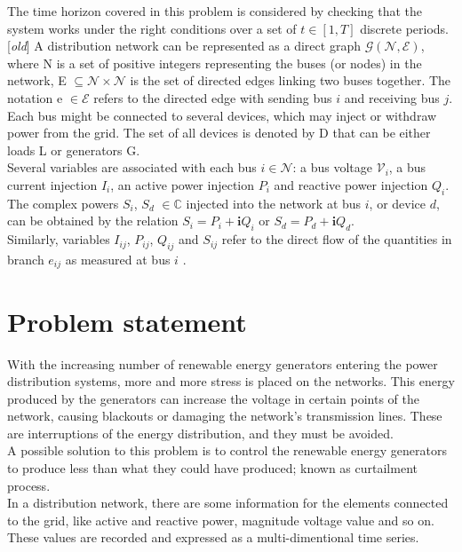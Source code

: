 The time horizon covered in this problem is considered by checking that the system works under the right conditions over a set of $t \in [1,T]$ discrete periods.\\

[\emph{old}] A distribution network can be represented as a direct graph $\mathcal{G}(\mathcal{N},\mathcal{E})$, where \gls{N} is a set of positive integers representing the buses (or nodes) in the network, \gls{E} $\subseteq \mathcal{N} \times \mathcal{N}$ is the set of directed edges linking two buses together. The notation \gls{e} $\in \mathcal{E}$ refers to the directed edge with sending bus $i$ and receiving bus $j$. Each bus might be connected to several devices, which may inject or withdraw power from the grid. The set of all devices is denoted by \gls{D} that can be either loads \gls{L} or generators \gls{G}. \\
Several variables are associated with each bus $i \in \mathcal{N}$: a bus voltage $\mathcal{V}_i$, a bus current injection $I_i$, an active power injection $P_i$ and reactive power injection $Q_i$. The complex powers $S_i$, $S_d$ $\in \mathbb{C}$ injected into the network at bus $i$, or device $d$, can be obtained by the relation $S_i = P_i + \mathbf{i}Q_i$ or $S_d = P_d + \mathbf{i}Q_d$. \\
Similarly, variables $I_{ij}$, $P_{ij}$, $Q_{ij}$ and $S_{ij}$ refer to the direct flow of the quantities in branch $e_{ij}$ as measured at bus $i$ \cite{gym-anm}.

\section{Problem statement}
\label{sec:ProbStat}
With the increasing number of renewable energy generators entering the power distribution systems, more and more stress is placed on the networks. This energy produced by the generators can increase the voltage in certain points of the network, causing blackouts or damaging the network's transmission lines. These are interruptions of the energy distribution, and they must be avoided. \\

A possible solution to this problem is to control the renewable energy generators to produce less than what they could have produced; known as curtailment process. \\
In a distribution network, there are some information for the elements connected to the grid, like active and reactive power, magnitude voltage value and so on. These values are recorded and expressed as a multi-dimentional time series.\\

